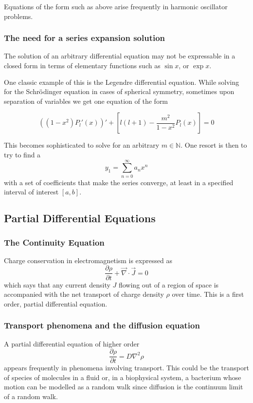 \documentclass{article}
\begin{document}
	
	Equations of the form such as above arise frequently in harmonic oscillator problems.
	
	\subsubsection{The need for a series expansion solution}
	The solution of an arbitrary differential equation may not be expressable in a closed form in terms of elementary functions such as $\sin x$, or $\exp x$.
	
	One classic example of this is the Legendre differential equation. While solving for the Schr$\ddot{\rm{o}}$dinger equation in cases of spherical symmetry, sometimes upon separation of variables we get one equation of the form
	
	$$ ((1-x^2)P_{l}'(x))' + \left[ l(l+1) - \frac{m^2}{1-x^2}P_l(x) \right] = 0$$
	
	This becomes sophisticated to solve for an arbitrary $m\in\mathbb{N}$. One resort is then to try to find a $$ y_1 = \sum_{n=0}^{\infty}a_n x^n$$ with a set of coefficients that make the series converge, at least in a specified interval of interest $[a,b]$.
	
	\subsection{Partial Differential Equations}
	\subsubsection{The Continuity Equation}
	Charge conservation in electromagnetism is expressed as
	$$ \frac{\partial \rho}{\partial t} + \vec{\nabla} \cdot \vec{J} = 0$$
	which says that any current density $J$ flowing out of a region of space is accompanied with the net transport of charge density $\rho$ over time. This is a first order, partial differential equation.
	
		\subsubsection{Transport phenomena and the diffusion equation}
		A partial differential equation of higher order
		$$ \frac{\partial \rho}{\partial t} = D \nabla^2 \rho$$
		appears frequently in phenomena involving transport. This could be the transport of species of molecules in a fluid or, in a biophysical system, a bacterium whose motion can be modelled as a random walk \textemdash since diffusion is the continuum limit of a random walk.
	
\end{document}
